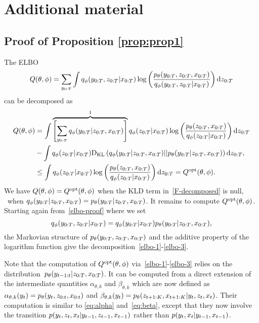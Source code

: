 \tocless\section{Additional material}
\tocless\subsection{Proof of Proposition \ref{prop:prop1}}
\label{app:prop1}
The ELBO 
\begin{equation}
\label{elbo-proof}
Q(\theta,\phi)= \sum_{y_{0:T}} \int q_\phi(y_{0:T},z_{0:T}|x_{0:T}) \log\left(\frac{p_{\theta}(y_{0:T},z_{0:T},x_{0:T})}{q_\phi(y_{0:T},z_{0:T}|x_{0:T})}\right) {\rm d}  z_{0:T} 
\end{equation}
can be decomposed as 
\begin{align}
\label{F-decomposed}
Q(\theta,\phi)   &= \int  \overbrace{\left[\sum_{y_{0:T}}  q_\phi(y_{0:T}|z_{0:T},x_{0:T})\right]}^{1} q_\phi(z_{0:T}|x_{0:T})  \log\left(\frac{p_{\theta}(z_{0:T},x_{0:T})}{q_\phi(z_{0:T}|x_{0:T})}\right) {\rm d}  z_{0:T} \nonumber  \\ 
    & -\int q_\phi(z_{0:T}|x_{0:T}) \mathrm{D}_{\mathrm{KL}} \left(q_\phi(y_{0:T}|z_{0:T},x_{0:T})||p_{\theta}(y_{0:T}|z_{0:T},x_{0:T})\right) {\rm d}  z_{0:T}, \\
    & \leq \int q_\phi(z_{0:T}|x_{0:T})  \log\left(\frac{p_{\theta}(z_{0:T},x_{0:T})}{q_\phi(z_{0:T}|x_{0:T})}\right) {\rm d}  z_{0:T} = Q^{\rm opt} (\theta,\phi)\text{.}
\end{align}
We have $Q(\theta,\phi)= Q^{\rm opt} (\theta,\phi)$ when the KLD term in~\eqref{F-decomposed} is null, 
\ie~when $q_\phi(y_{0:T}|z_{0:T},x_{0:T})=p_{\theta}(y_{0:T}|z_{0:T},x_{0:T})$.
It remains to compute $Q^{\rm opt} (\theta,\phi)$.
Starting again from~\eqref{elbo-proof} where
we set 
$$q_\phi(y_{0:T},z_{0:T}|x_{0:T})
=q_\phi(y_{0:T}|x_{0:T})p_{\theta}(y_{0:T}|z_{0:T},x_{0:T}),$$ 
the Markovian structure of $p_{\theta}(y_{0:T},z_{0:T},x_{0:T})$
and the additive property of the logarithm function
give the decomposition~\eqref{elbo-1}-\eqref{elbo-3}.

Note that the computation of $Q^{\rm opt} (\theta,\phi)$
via~\eqref{elbo-1}-\eqref{elbo-3}
relies on the distribution~$p_{\theta}(y_{t-1:t}|z_{0:T},x_{0:T})$.
It can be computed from a direct extension of the intermediate quantities $\alpha_{\theta,k}$ and
$\beta_{\theta,k}$ which are now defined as 
$\alpha_{\theta,k}(y_t)=p_{\theta}(y_t,z_{0:t},x_{0:t})$
and 
$\beta_{\theta,k}(y_t)=p_{\theta}(z_{t+1:K},x_{t+1:K}|y_t,z_t,x_t)$. Their computation is similar to 
\eqref{eq:alpha} and~\eqref{eq:beta}, except
that they now involve the transition 
$p(y_t,z_t,x_t|y_{t-1},z_{t-1},x_{t-1})$
rather than $p(y_t,x_t|y_{t-1},x_{t-1})$.

